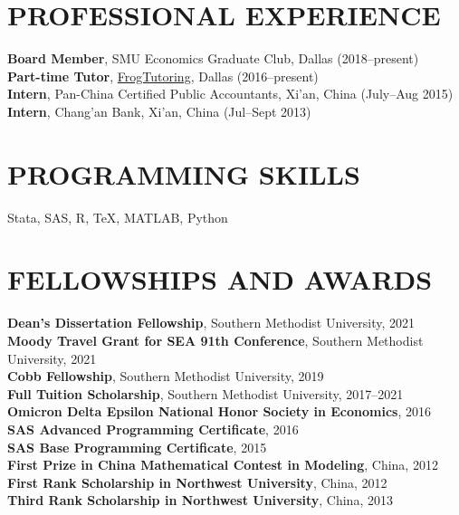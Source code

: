 \documentclass[11pt]{res}
\begin{document}
\begin{resume}
\section{PROFESSIONAL EXPERIENCE}\vspace{2mm}
{\bf Board Member}, SMU Economics Graduate Club, Dallas (2018--present)\\
{\bf Part-time Tutor}, \href{https://frogtutoring.com/tutor/TX/Dallas/19103}{FrogTutoring}, Dallas (2016--present)\\
{\bf Intern}, Pan-China Certified Public Accountants, Xi’an, China (July--Aug 2015)\\
{\bf Intern}, Chang’an Bank, Xi’an, China (Jul--Sept 2013)

\section{PROGRAMMING SKILLS}\vspace{2mm}
Stata, SAS, R, \TeX, MATLAB, Python 

\section{FELLOWSHIPS AND AWARDS}\vspace{2mm}
{\bf Dean's Dissertation Fellowship}, Southern Methodist University, 2021\vspace{.5mm}\\
{\bf Moody Travel Grant for SEA 91th Conference}, Southern Methodist University, 2021\vspace{.5mm}\\
{\bf Cobb Fellowship}, Southern Methodist University, 2019\vspace{.5mm}\\
{\bf Full Tuition Scholarship}, Southern Methodist University, 2017--2021\vspace{.5mm}\\
{\bf Omicron Delta Epsilon National Honor Society in Economics}, 2016\vspace{.5mm}\\
{\bf SAS Advanced Programming Certificate}, 2016\vspace{.5mm}\\
{\bf SAS Base Programming Certificate}, 2015\vspace{.5mm}\\
{\bf First Prize in China Mathematical Contest in Modeling}, China, 2012\vspace{.5mm}\\
{\bf First Rank Scholarship in Northwest University}, China, 2012\vspace{.5mm}\\
{\bf Third Rank Scholarship in Northwest University}, China, 2013\\


\end{resume}
\end{document}

